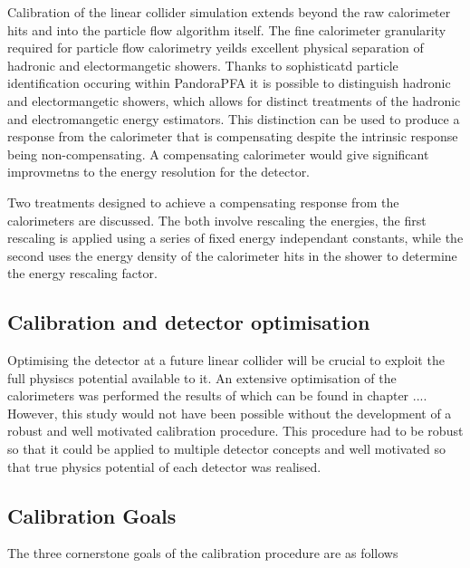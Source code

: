 Calibration of the linear collider simulation extends beyond the raw calorimeter hits and into the particle flow algorithm itself.  The fine calorimeter granularity required for particle flow calorimetry yeilds excellent physical separation of hadronic and electormangetic showers.  Thanks to sophisticatd particle identification occuring within PandoraPFA it is possible to distinguish hadronic and electormangetic showers, which allows for distinct treatments of the hadronic and electromangetic energy estimators.  This distinction can be used to produce a response from the calorimeter that is compensating despite the intrinsic response being non-compensating.  A compensating calorimeter would give significant improvmetns to the energy resolution for the detector.

Two treatments designed to achieve a compensating response from the calorimeters are discussed.  The both involve rescaling the energies, the first rescaling is applied using a series of fixed energy independant constants, while the second uses the energy density of the calorimeter hits in the shower to determine the energy rescaling factor.

\subsection{Calibration and detector optimisation}

Optimising the detector at a future linear collider will be crucial to exploit the full physiscs potential available to it.  An extensive optimisation of the calorimeters was performed the results of which can be found in chapter ....  However, this study would not have been possible without the development of a robust and well motivated calibration procedure.  This procedure had to be robust so that it could be applied to multiple detector concepts and well motivated so that true physics potential of each detector was realised.

\subsection{Calibration Goals}

The three cornerstone goals of the calibration procedure are as follows


